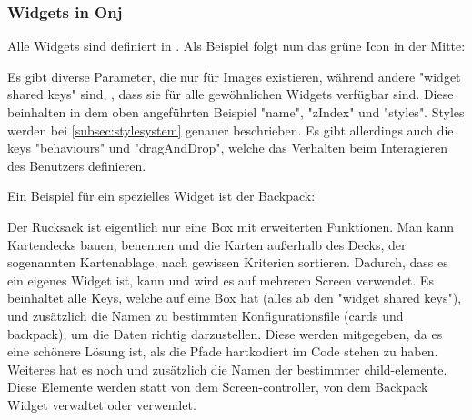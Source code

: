 \subsubsection{Widgets in Onj}\label{subsubsec:widgetsinonj}
\renewcommand{\kapitelautor}{Autor: Felix Zwickelstorfer}
Alle Widgets sind definiert in .
Als Beispiel folgt nun das grüne Icon in der Mitte:
Es gibt diverse Parameter, die nur für Images existieren, während andere "widget shared keys" sind, \dah, dass sie für alle gewöhnlichen Widgets verfügbar sind.
Diese beinhalten in dem oben angeführten Beispiel "name", "zIndex" und "styles".
Styles werden bei \ref{subsec:stylesystem} genauer beschrieben.
Es gibt allerdings auch die keys "behaviours" und "dragAndDrop", welche das Verhalten beim Interagieren des Benutzers definieren.

Ein Beispiel für ein spezielles Widget ist der Backpack:
Der Rucksack ist eigentlich nur eine Box mit erweiterten Funktionen.
Man kann Kartendecks bauen, benennen und die Karten außerhalb des Decks, der sogenannten Kartenablage, nach gewissen Kriterien sortieren.
Dadurch, dass es ein eigenes Widget ist, kann und wird es auf mehreren Screen verwendet.
Es beinhaltet alle Keys, welche auf eine Box hat (alles ab den "widget shared keys"), und zusätzlich die Namen zu bestimmten Konfigurationsfile (cards und backpack), um die Daten richtig darzustellen.
Diese werden mitgegeben, da es eine schönere Lösung ist, als die Pfade hartkodiert im Code stehen zu haben.
Weiteres hat es noch und zusätzlich die Namen der bestimmter child-elemente.
Diese Elemente werden statt von dem Screen-controller, von dem Backpack Widget verwaltet oder verwendet.
\renewcommand{\kapitelautor}{Autor: Felix Zwickelstorfer}
